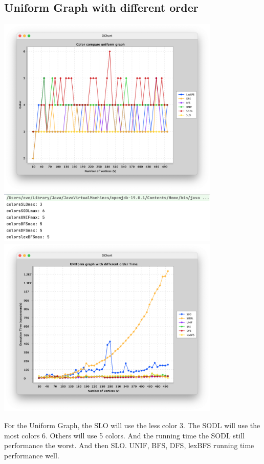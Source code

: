 \documentclass{article}
\begin{document}
\subsection{Uniform Graph with different order}
    \begin{center}
            \includegraphics[width=0.8\textwidth]{2_5.png}
            \includegraphics[width=0.8\textwidth]{2_6.png}
            \includegraphics[width=0.8\textwidth]{2t3.png}
    \end{center}
    For the Uniform Graph, the SLO will use the less color 3. The SODL will use the most colors 6. Others will use 5 colors. And the running time the SODL still performance the worst. And then SLO. UNIF, BFS, DFS, lexBFS running time performance well.
\end{document}
